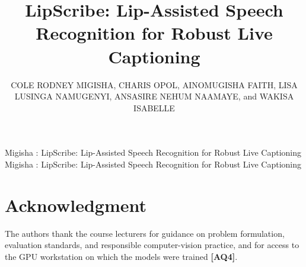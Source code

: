 \documentclass{ieeeaccess}
\begin{document}

\title{LipScribe: Lip-Assisted Speech Recognition for Robust Live Captioning}

\author{\uppercase{Cole Rodney Migisha},
\uppercase{Charis Opol},
\uppercase{Ainomugisha Faith},
\uppercase{Lisa Lusinga Namugenyi},
\uppercase{Ansasire Nehum Naamaye},
and \uppercase{Wakisa Isabelle}}

\address[1]{Department of Computer Science, Uganda Christian University, Mukono, Uganda
(e-mail: \{b29657, b29654, b27518, b30300, b29785, b30311\}@students.ucu.ac.ug)}


\markboth
{Migisha \headeretal: LipScribe: Lip-Assisted Speech Recognition for Robust Live Captioning}
{Migisha \headeretal: LipScribe: Lip-Assisted Speech Recognition for Robust Live Captioning}




\titlepgskip=-15pt

\maketitle













\section*{Acknowledgment}
The authors thank the course lecturers for guidance on problem formulation, evaluation standards,
and responsible computer-vision practice, and for access to the GPU workstation on which the models
were trained \textbf{[AQ4]}.




\EOD
\end{document}
